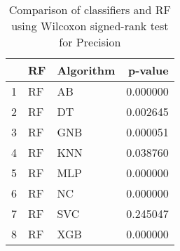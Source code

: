 \begin{table}
\footnotesize
\caption{Comparison of classifiers and RF using Wilcoxon signed-rank test for Precision}
\label{tab:RF wilcoxon Precision comparison}
\begin{tabular}{lllr}
\hline
 & RF & Algorithm & p-value \\
\hline
1 & RF & AB & 0.000000 \\
2 & RF & DT & 0.002645 \\
3 & RF & GNB & 0.000051 \\
4 & RF & KNN & 0.038760 \\
5 & RF & MLP & 0.000000 \\
6 & RF & NC & 0.000000 \\
7 & RF & SVC & 0.245047 \\
8 & RF & XGB & 0.000000 \\
\hline
\end{tabular}
\end{table}
